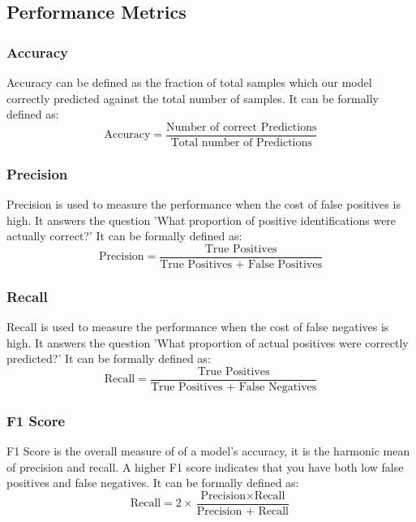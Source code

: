 \documentclass[fleqn,usenatbib]{mnras}
\begin{document}
\subsection{Performance Metrics}
\subsubsection{Accuracy}
\hspace*{0.25 in} Accuracy can be defined as the fraction of total samples which our model correctly predicted against the total number of samples. It can be formally defined as:
\begin{equation}
\text{Accuracy} = \frac{\text{Number of correct Predictions}}{\text{Total number of Predictions}}
\end{equation}

\subsubsection{Precision}
\hspace*{0.25 in} Precision is used to measure the performance when the cost of false positives is high. It answers the question 'What proportion of positive identifications were actually correct?' It can be formally defined as:
\begin{equation}
\text{Precision} = \frac{\text{True Positives}}{\text{True Positives + False Positives}}
\end{equation}

\subsubsection{Recall}
\hspace*{0.25 in} Recall is used to measure the performance when the cost of false negatives is high.  It answers the question 'What proportion of actual positives were correctly predicted?' It can be formally defined as:
\begin{equation}
\text{Recall} = \frac{\text{True Positives}}{\text{True Positives + False Negatives}}
\end{equation}

\subsubsection{F1 Score}
\hspace*{0.25 in} F1 Score is the overall measure of of a model's accuracy, it is the harmonic mean of precision and recall. A higher F1 score indicates that you have both low false positives and false negatives. It can be formally defined as:
\begin{equation}
\text{Recall} = 2\times \frac{\text{Precision} \times \text{Recall}}{\text{Precision + Recall}}
\end{equation}
\end{document}

